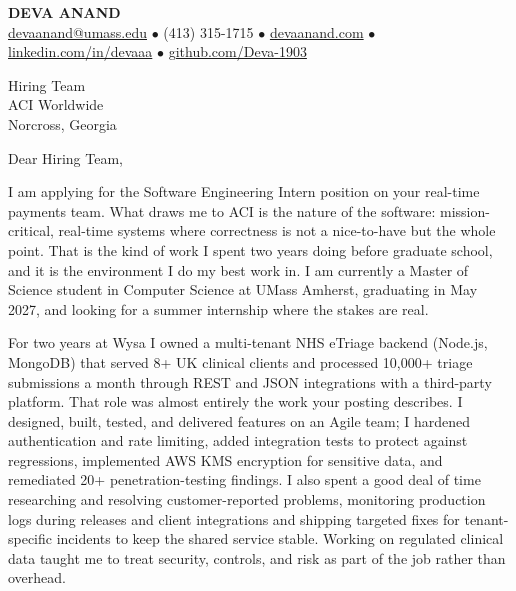 \documentclass[letterpaper,11pt]{article}
\begin{document}
\begin{center}
    {\fontsize{18}{20}\selectfont\bfseries DEVA ANAND}\\ \vspace{3pt}
    {\small
    \href{mailto:devaanand@umass.edu}{devaanand@umass.edu}
    \enspace$\bullet$\enspace
    (413) 315-1715
    \enspace$\bullet$\enspace
    \href{https://devaanand.com}{devaanand.com}
    \enspace$\bullet$\enspace
    \href{https://linkedin.com/in/devaaa/}{linkedin.com/in/devaaa}
    \enspace$\bullet$\enspace
    \href{https://github.com/Deva-1903}{github.com/Deva-1903}}
\end{center}
\vspace{6pt}

\noindent Hiring Team \\
ACI Worldwide \\
Norcross, Georgia

\vspace{2pt}

\noindent Dear Hiring Team,

I am applying for the Software Engineering Intern position on your real-time payments team. What draws me to ACI is the nature of the software: mission-critical, real-time systems where correctness is not a nice-to-have but the whole point. That is the kind of work I spent two years doing before graduate school, and it is the environment I do my best work in. I am currently a Master of Science student in Computer Science at UMass Amherst, graduating in May 2027, and looking for a summer internship where the stakes are real.

For two years at Wysa I owned a multi-tenant NHS eTriage backend (Node.js, MongoDB) that served 8+ UK clinical clients and processed 10,000+ triage submissions a month through REST and JSON integrations with a third-party platform. That role was almost entirely the work your posting describes. I designed, built, tested, and delivered features on an Agile team; I hardened authentication and rate limiting, added integration tests to protect against regressions, implemented AWS KMS encryption for sensitive data, and remediated 20+ penetration-testing findings. I also spent a good deal of time researching and resolving customer-reported problems, monitoring production logs during releases and client integrations and shipping targeted fixes for tenant-specific incidents to keep the shared service stable. Working on regulated clinical data taught me to treat security, controls, and risk as part of the job rather than overhead.
\end{document}
